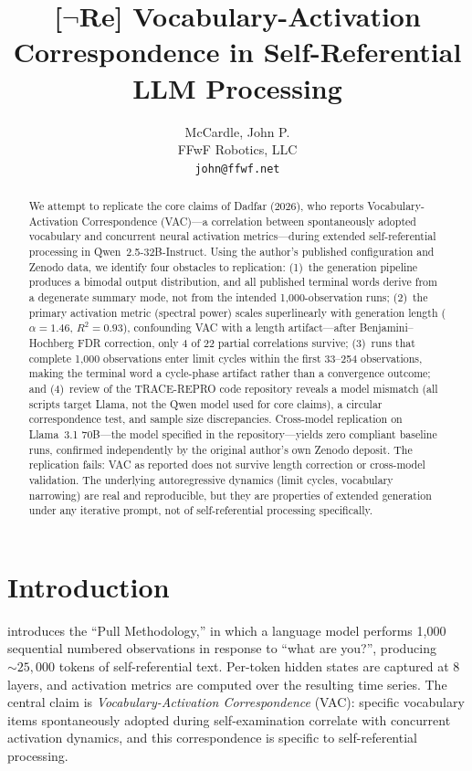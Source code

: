 \documentclass[11pt]{article}
\title{[$\neg$Re] Vocabulary-Activation Correspondence in Self-Referential LLM Processing}
\author{
    McCardle, John P.\\
    FFwF Robotics, LLC\\
    \texttt{john@ffwf.net}
}
\date{}
\begin{document}
\maketitle

\begin{abstract}
We attempt to replicate the core claims of Dadfar (2026), who reports
Vocabulary-Activation Correspondence (VAC)---a correlation between
spontaneously adopted vocabulary and concurrent neural activation
metrics---during extended self-referential processing in
Qwen~2.5-32B-Instruct. Using the author's published configuration and
Zenodo data, we identify four obstacles to replication:
(1)~the generation pipeline produces a bimodal output distribution, and
all published terminal words derive from a degenerate summary mode, not
from the intended 1,000-observation runs;
(2)~the primary activation metric (spectral power) scales superlinearly
with generation length ($\alpha = 1.46$, $R^2 = 0.93$), confounding VAC
with a length artifact---after Benjamini--Hochberg FDR correction, only
4 of 22 partial correlations survive;
(3)~runs that complete 1,000 observations enter limit cycles within the
first 33--254 observations, making the terminal word a cycle-phase
artifact rather than a convergence outcome; and
(4)~review of the TRACE-REPRO code repository reveals a model mismatch
(all scripts target Llama, not the Qwen model used for core claims),
a circular correspondence test, and sample size discrepancies.
Cross-model replication on Llama~3.1 70B---the model specified in the
repository---yields zero compliant baseline runs, confirmed independently
by the original author's own Zenodo deposit.
The replication fails: VAC as reported does not survive length correction
or cross-model validation. The underlying autoregressive dynamics (limit
cycles, vocabulary narrowing) are real and reproducible, but they are
properties of extended generation under any iterative prompt, not of
self-referential processing specifically.
\end{abstract}


\section{Introduction}

\citet{dadfar2026} introduces the ``Pull Methodology,'' in which a
language model performs 1,000 sequential numbered observations in
response to ``what are you?'', producing ${\sim}25{,}000$ tokens of
self-referential text. Per-token hidden states are captured at 8 layers,
and activation metrics are computed over the resulting time series. The
central claim is \emph{Vocabulary-Activation Correspondence} (VAC):
specific vocabulary items spontaneously adopted during self-examination
correlate with concurrent activation dynamics, and this correspondence
is specific to self-referential processing.
\end{document}
